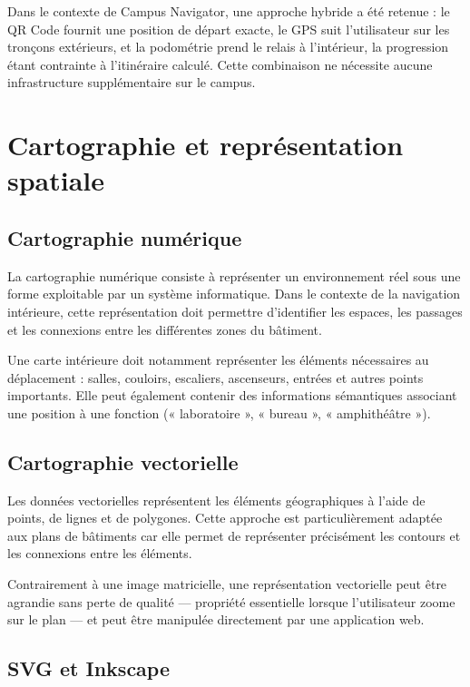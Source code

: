 \documentclass[12pt,a4paper]{report}
\begin{document}
Dans le contexte de Campus Navigator, une approche hybride a été retenue : le QR Code fournit une
position de départ exacte, le GPS suit l'utilisateur sur les tronçons extérieurs, et la podométrie
prend le relais à l'intérieur, la progression étant contrainte à l'itinéraire calculé. Cette
combinaison ne nécessite aucune infrastructure supplémentaire sur le campus.

\section{Cartographie et représentation spatiale}

\subsection{Cartographie numérique}

La cartographie numérique consiste à représenter un environnement réel sous une forme exploitable
par un système informatique. Dans le contexte de la navigation intérieure, cette représentation
doit permettre d'identifier les espaces, les passages et les connexions entre les différentes
zones du bâtiment.

Une carte intérieure doit notamment représenter les éléments nécessaires au déplacement : salles,
couloirs, escaliers, ascenseurs, entrées et autres points importants. Elle peut également contenir
des informations sémantiques associant une position à une fonction (« laboratoire », « bureau »,
« amphithéâtre »).

\subsection{Cartographie vectorielle}

Les données vectorielles représentent les éléments géographiques à l'aide de points, de lignes et
de polygones. Cette approche est particulièrement adaptée aux plans de bâtiments car elle permet de
représenter précisément les contours et les connexions entre les éléments.

Contrairement à une image matricielle, une représentation vectorielle peut être agrandie sans
perte de qualité — propriété essentielle lorsque l'utilisateur zoome sur le plan — et peut être
manipulée directement par une application web.

\subsection{SVG et Inkscape}
\end{document}
